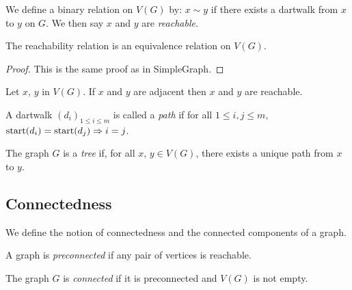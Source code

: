 \begin{definition}
  \label{def:reachable}
  We define a binary relation on $V(G)$ by: $x \sim y$ if there exists a dartwalk
  from $x$ to $y$ on $G$. We then say $x$ and $y$ are \emph{reachable}.
\end{definition}

\begin{proposition}
  \label{prop:reachable_is_equivalence}
  \leanok
  The reachability relation is an equivalence relation on $V(G)$.
\end{proposition}

\begin{proof}
  This is the same proof as in SimpleGraph.
\end{proof}

\begin{lemma}
  \label{lem:adj_towalk}
  \leanok
  Let $x$, $y$ in $V(G)$. If $x$ and $y$ are adjacent then $x$ and $y$ are reachable.
\end{lemma}

\begin{definition}
  \label{def:dartpath}
  A dartwalk $(d_i)_{1 \leq i \leq m}$ is called a \emph{path} if
  for all $1 \leq i,j \leq m$, $\mathrm{start}(d_i) = \mathrm{start}(d_j) \Rightarrow i=j$.
\end{definition}

\begin{definition}
  \label{def:tree}
  The graph $G$ is a \emph{tree} if, for all $x$, $y \in V(G)$,
  there exists a unique path from $x$ to $y$.
\end{definition}

\subsection{Connectedness}

We define the notion of connectedness and the connected components of a graph.

\begin{definition}
  \label{def:preconnected}
  \leanok
  A graph is \emph{preconnected} if any pair of vertices is reachable.
\end{definition}

\begin{definition}
  \label{def:connected}
  \leanok
  The graph $G$ is \emph{connected} if it is preconnected and $V(G)$ is not empty.
\end{definition}

